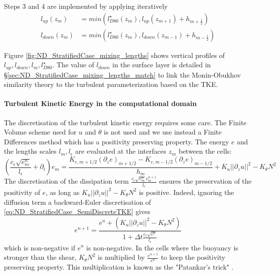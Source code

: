 Steps 3 and 4 are implemented by applying iteratively
\begin{equation}
	\begin{aligned}
		l_{up}(z_m) &= min\left(l^\star_{D80}(z_m),
		l_{up}(z_{m+1}) + h_{m+\frac{1}{2}}\right) \\
		l_{down}(z_m) &= min\left(l^\star_{D80}(z_m),
		l_{down}(z_{m-1}) + h_{m-\frac{1}{2}}\right)
	\end{aligned}
\end{equation}

Figure \ref{fig:ND_StratifiedCase_mixing_lengths} shows vertical
profiles of $l_{up}, l_{down}, l_m, l_{D80}^\star$. The value of
$l_{down}$ in the surface layer is detailed in
\S \ref{sec:ND_StratifiedCase_mixing_lengths_match} to link
the Monin-Obukhov similarity theory to the turbulent
parameterization based on the TKE.
%
\paragraph{Turbulent Kinetic Energy in the computational domain}
The discretisation of the turbulent kinetic energy
requires some care. The Finite Volume scheme used for
$u$ and $\theta$ is not used and we use instead a Finite Differences
method which has a positivity preserving property.
The energy $e$ and the lengths scales
$l_m, l_\epsilon$ are evaluated at the interfaces
$z_m$ between the cells:
\begin{equation}
\label{eq:ND_StratifiedCase_SemiDiscreteTKE}
    \left(
    \frac{c_\epsilon \sqrt{e^n_m}}{l_\epsilon}
    + \partial_t
    \right) e_m
    =\frac{K_{e,m+1/2} (\partial_z e)_{m+1/2} -
    K_{e,m-1/2} (\partial_z e)_{m-1/2}}{h_{m}}
    + K_u ||\partial_z u||^2
    - K_\theta N^2
\end{equation}
The discretisation of the dissipation term
$\frac{c_\epsilon \sqrt{e_m^n}e_m^{n+1}}{l_\epsilon}$
ensures the preservation
of the positivity of $e$, as long as
$K_u ||\partial_z u||^2 - K_\theta N^2$ is positive.
Indeed, ignoring the diffusion term a backward-Euler
discretisation of \eqref{eq:ND_StratifiedCase_SemiDiscreteTKE}
gives
\begin{equation}
	e^{n+1} = \frac{e^n +
	\left(K_u ||\partial_z u||^2 - K_\theta N^2\right)}
	{1 + \Delta t \frac{c_\epsilon \sqrt{e^n}}{l_\epsilon}}
\end{equation}
which is non-negative if $e^n$ is non-negative.
In the cells where the buoyancy is stronger than the shear,
$K_\theta N^2$ is multiplied by
$\frac{e^{n+1}}{e^n}$ to keep the positivity preserving property.
This multiplication is known as the "Patankar's trick"
\citep{lemarie_simplified_2021}.
%
